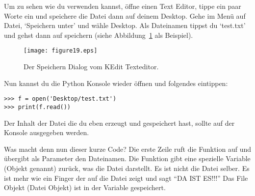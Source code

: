 \begin{LINUX}
Um zu sehen wie du  verwenden kannst, öffne einen Text Editor, tippe ein paar Worte ein und speichere die Datei dann auf deinem Desktop. Gehe im Menü auf Datei, `Speichern unter' und wähle Desktop. Als Dateinamen tippst du `test.txt' und gehst dann auf speichern (siehe Abbildung~\ref{fig19} als Beispiel).

\begin{figure}
\begin{center}
\texttt{[image: figure19.eps]}
\end{center}
\caption{Der Speichern Dialog vom KEdit Texteditor.}\label{fig19}
\end{figure}

Nun kannst du die Python Konsole wieder öffnen und folgendes eintippen:

\begin{Verbatim}[frame=single]
>>> f = open('Desktop/test.txt')
>>> print(f.read())
\end{Verbatim}

Der Inhalt der Datei die du eben erzeugt und gespeichert hast, sollte auf der Konsole ausgegeben werden. %
\end{LINUX}

Was macht denn nun dieser kurze Code? Die erste Zeile ruft die Funktion  auf und übergibt als Parameter den Dateinamen. Die Funktion gibt eine spezielle Variable (Objekt genannt) zurück, was die Datei darstellt. Es ist nicht die Datei selber. Es ist mehr wie ein Finger der auf die Datei zeigt und sagt ``DA IST ES!!!'' Das File Objekt (Datei Objekt) ist in der Variable  gespeichert.

